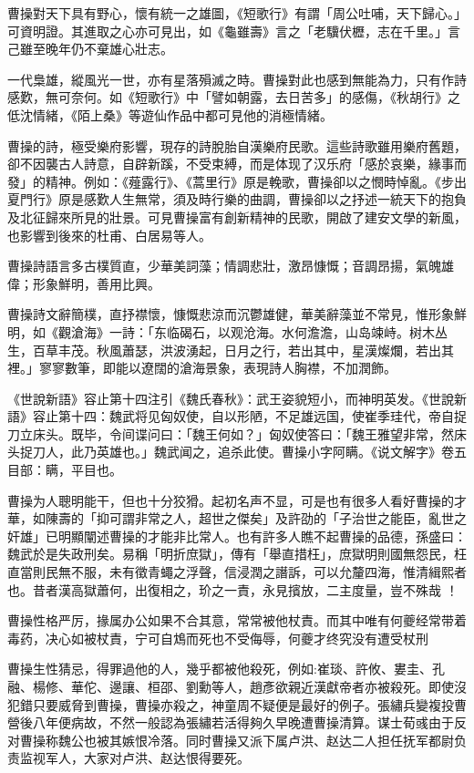 曹操對天下具有野心，懷有統一之雄圖，《短歌行》有謂「周公吐哺，天下歸心。」可資明證。其進取之心亦可見出，如《龜雖壽》言之「老驥伏櫪，志在千里。」言己雖至晚年仍不棄雄心壯志。

一代梟雄，縱風光一世，亦有星落殞滅之時。曹操對此也感到無能為力，只有作詩感歎，無可奈何。如《短歌行》中「譬如朝露，去日苦多」的感傷，《秋胡行》之低沈情緒，《陌上桑》等遊仙作品中都可見他的消極情緒。

曹操的詩，極受樂府影響，現存的詩脫胎自漢樂府民歌。這些詩歌雖用樂府舊題，卻不因襲古人詩意，自辟新蹊，不受束縛，而是体现了汉乐府「感於哀樂，緣事而發」的精神。例如：《薤露行》、《蒿里行》原是輓歌，曹操卻以之憫時悼亂。《步出夏門行》原是感歎人生無常，須及時行樂的曲調，曹操卻以之抒述一統天下的抱負及北征歸來所見的壯景。可見曹操富有創新精神的民歌，開啟了建安文學的新風，也影響到後來的杜甫、白居易等人。

曹操詩語言多古樸質直，少華美詞藻；情調悲壯，激昂慷慨；音調昂揚，氣魄雄偉；形象鮮明，善用比興。

曹操詩文辭簡樸，直抒襟懷，慷慨悲涼而沉鬱雄健，華美辭藻並不常見，惟形象鮮明，如《觀滄海》一詩：「东临碣石，以观沧海。水何澹澹，山岛竦峙。树木丛生，百草丰茂。秋風蕭瑟，洪波湧起，日月之行，若出其中，星漢燦爛，若出其裡。」寥寥數筆，即能以遼闊的滄海景象，表現詩人胸襟，不加潤飾。

《世說新語》容止第十四注引《魏氏春秋》：武王姿貌短小，而神明英发。《世說新語》容止第十四：魏武将见匈奴使，自以形陋，不足雄远国，使崔季珪代，帝自捉刀立床头。既毕，令间谍问曰：「魏王何如？」匈奴使答曰：「魏王雅望非常，然床头捉刀人，此乃英雄也。」魏武闻之，追杀此使。曹操小字阿瞒。《说文解字》卷五目部：瞒，平目也。

曹操为人聰明能干，但也十分狡猾。起初名声不显，可是也有很多人看好曹操的才華，如陳壽的「抑可謂非常之人，超世之傑矣」及許劭的「子治世之能臣，亂世之奸雄」已明顯闡述曹操的才能非比常人。也有許多人瞧不起曹操的品德，孫盛曰：魏武於是失政刑矣。易稱「明折庶獄」，傳有「舉直措枉」，庶獄明則國無怨民，枉直當則民無不服，未有徵青蠅之浮聲，信浸潤之譖訴，可以允釐四海，惟清緝熙者也。昔者漢高獄蕭何，出復相之，玠之一責，永見擯放，二主度量，豈不殊哉 ！

曹操性格严厉，掾属办公如果不合其意，常常被他杖責。而其中唯有何夔经常带着毒药，决心如被杖責，宁可自鴆而死也不受侮辱，何夔才终究没有遭受杖刑

曹操生性猜忌，得罪過他的人，幾乎都被他殺死，例如:崔琰、許攸、婁圭、孔融、楊修、華佗、邊讓、桓邵、劉勳等人，趙彥欲親近漢獻帝者亦被殺死。即使沒犯錯只要威脅到曹操，曹操亦殺之，神童周不疑便是最好的例子。張繡兵變複投曹營後八年便病故，不然一般認為張繡若活得夠久早晚遭曹操清算。谋士荀彧由于反对曹操称魏公也被其嫉恨冷落。同时曹操又派下属卢洪、赵达二人担任抚军都尉负责监视军人，大家对卢洪、赵达恨得要死。

